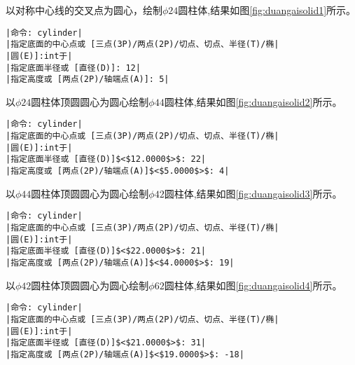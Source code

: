\begin{procedure}
以对称中心线的交叉点为圆心，绘制$\phi 24$圆柱体,结果如图\ref{fig:duangaisolid1}所示。
\begin{figure}[htbp]
\centering
\begin{floatrow}[3]
\end{floatrow}
\end{figure}
\begin{lstlisting}
|命令: cylinder|
|指定底面的中心点或 [三点(3P)/两点(2P)/切点、切点、半径(T)/椭|
|圆(E)]:int于|
|指定底面半径或 [直径(D)]: 12|
|指定高度或 [两点(2P)/轴端点(A)]: 5|
\end{lstlisting}
以$\phi 24$圆柱体顶圆圆心为圆心绘制$\phi 44$圆柱体,结果如图\ref{fig:duangaisolid2}所示。
\begin{lstlisting}
|命令: cylinder|
|指定底面的中心点或 [三点(3P)/两点(2P)/切点、切点、半径(T)/椭|
|圆(E)]:int于|
|指定底面半径或 [直径(D)]$<$12.0000$>$: 22|
|指定高度或 [两点(2P)/轴端点(A)]$<$5.0000$>$: 4|
\end{lstlisting}
以$\phi 44$圆柱体顶圆圆心为圆心绘制$\phi 42$圆柱体,结果如图\ref{fig:duangaisolid3}所示。
\begin{lstlisting}
|命令: cylinder|
|指定底面的中心点或 [三点(3P)/两点(2P)/切点、切点、半径(T)/椭|
|圆(E)]:int于|
|指定底面半径或 [直径(D)]$<$22.0000$>$: 21|
|指定高度或 [两点(2P)/轴端点(A)]$<$4.0000$>$: 19|
\end{lstlisting}
以$\phi 42$圆柱体顶圆圆心为圆心绘制$\phi 62$圆柱体,结果如图\ref{fig:duangaisolid4}所示。
\begin{figure}[htbp]
\centering
\begin{floatrow}[3]
\end{floatrow}
\end{figure}
\begin{lstlisting}
|命令: cylinder|
|指定底面的中心点或 [三点(3P)/两点(2P)/切点、切点、半径(T)/椭|
|圆(E)]:int于|
|指定底面半径或 [直径(D)]$<$21.0000$>$: 31|
|指定高度或 [两点(2P)/轴端点(A)]$<$19.0000$>$: -18|

\end{lstlisting}
\end{procedure}
